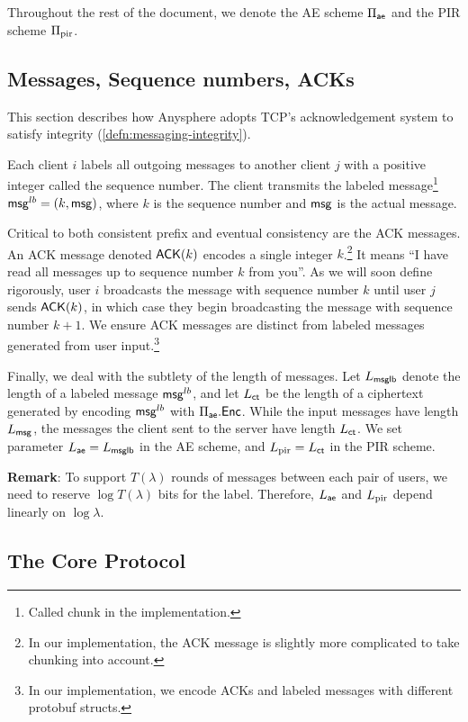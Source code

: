 Throughout the rest of the document, we denote the AE scheme $\Pi_{\mathsf{ae}}$ and the PIR scheme $\Pi_{\text{pir}}$.
\subsection{Messages, Sequence numbers, ACKs}
\label{subsec:ACK}
This section describes how Anysphere adopts TCP's acknowledgement system to satisfy integrity (\cref{defn:messaging-integrity}).

Each client $i$ labels all outgoing messages to another client $j$ with a positive integer called the sequence number. The client transmits the labeled message\footnote{Called chunk in the implementation.} $\mathsf{msg}^{lb} = (k, \mathsf{msg})$, where $k$ is the sequence number and $\mathsf{msg}$ is the actual message. 

Critical to both consistent prefix and eventual consistency are the ACK messages. An ACK message denoted $\mathsf{ACK}(k)$ encodes a single integer $k$.\footnote{In our implementation, the ACK message is slightly more complicated to take chunking into account.} It means ``I have read all messages up to sequence number $k$ from you''. As we will soon define rigorously, user $i$ broadcasts the message with sequence number $k$ until user $j$ sends $\mathsf{ACK}(k)$, in which case they begin broadcasting the message with sequence number $k + 1$. We ensure ACK messages are distinct from labeled messages generated from user input.\footnote{In our implementation, we encode ACKs and labeled messages with different protobuf structs.}

Finally, we deal with the subtlety of the length of messages. Let $L_{\mathsf{msglb}}$ denote the length of a labeled message $\mathsf{msg}^{lb}$, and let $L_{\mathsf{ct}}$ be the length of a ciphertext generated by encoding $\mathsf{msg}^{lb}$ with $\Pi_{\mathsf{ae}}.\mathsf{Enc}$. While the input messages have length $L_{\mathsf{msg}}$, the messages the client sent to the server have length $L_{\mathsf{ct}}$. We set parameter $L_{\mathsf{ae}} = L_{\mathsf{msglb}}$ in the AE scheme, and $L_{\text{pir}} = L_{\mathsf{ct}}$ in the PIR scheme.

\textbf{Remark}: To support $T(\lambda)$ rounds of messages between each pair of users, we need to reserve $\log T(\lambda)$ bits for the label. Therefore, $L_{\mathsf{ae}}$ and $L_{\text{pir}}$ depend linearly on $\log \lambda$.

\subsection{The Core Protocol}
\label{subsec:core-protocol}

